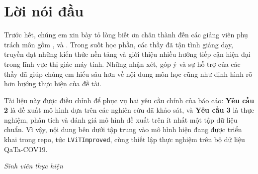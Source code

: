 \chapter*{Lời nói đầu}

Trước hết, chúng em xin bày tỏ lòng biết ơn chân thành đến các giảng viên phụ trách môn \coursename{} gồm \advisorone, \advisortwo{} và \advisorthree. Trong suốt học phần, các thầy đã tận tình giảng dạy, truyền đạt những kiến thức nền tảng và giới thiệu nhiều hướng tiếp cận hiện đại trong lĩnh vực thị giác máy tính. Những nhận xét, góp ý và sự hỗ trợ của các thầy đã giúp chúng em hiểu sâu hơn về nội dung môn học cũng như định hình rõ hơn hướng thực hiện của đề tài.

Tài liệu này được điều chỉnh để phục vụ hai yêu cầu chính của báo cáo: \textbf{Yêu cầu 2} là đề xuất mô hình dựa trên các nghiên cứu đã khảo sát, và \textbf{Yêu cầu 3} là thực nghiệm, phân tích và đánh giá mô hình đề xuất trên ít nhất một tập dữ liệu chuẩn. Vì vậy, nội dung bên dưới tập trung vào mô hình hiện đang được triển khai trong repo, tức \texttt{LViTImproved}, cùng thiết lập thực nghiệm trên bộ dữ liệu QaTa-COV19.

\vspace{1cm}

\begin{flushright}
\textit{Sinh viên thực hiện}\\
\textit{\studentone}\\
\textit{\studenttwo}
\end{flushright}

\clearpage
